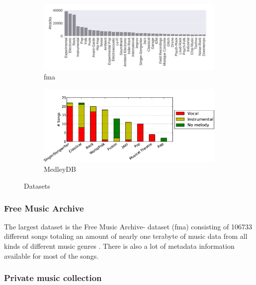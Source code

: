 \begin{figure}[htbp]
{{	\begin{subfigure}{0.5\textwidth}
		\centering
		\includegraphics[scale=0.35]{Images/fma_genre.JPG}
		\caption{fma \cite[p. 4]{fma1}}
		\label{fmadist}
	\end{subfigure}
	\begin{subfigure}{0.5\textwidth}
		\centering
		\includegraphics[scale=0.35]{Images/MedleyDB1.png}
		\caption{MedleyDB \cite[p. 2]{medleydb1}}
		\label{medleydbdist}
	\end{subfigure}
	}}
	\caption{Datasets}
	\label{fig:datasetdist}
\end{figure}
\FloatBarrier

\subsubsection{Free Music Archive}

The largest dataset is the Free Music Archive- dataset (fma) consisting of 106733 different songs totaling an amount of nearly one terabyte of music data from all kinds of different music genres \cite{fma1}. There is also a lot of metadata information available for most of the songs.

\subsubsection{Private music collection}

